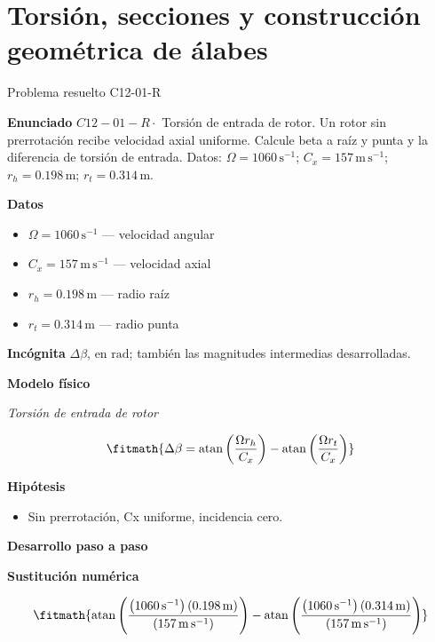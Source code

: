 \documentclass[10pt,openany]{book}
\begin{document}
\chapter{Torsión, secciones y construcción geométrica de álabes}
\begin{studiumworked}{Problema resuelto C12-01-R}


\noindent\textbf{Enunciado}
\(C12-01-R \cdot\) Torsión de entrada de rotor. Un rotor sin prerrotación recibe velocidad axial uniforme. Calcule beta a raíz y punta y la diferencia de torsión de entrada. Datos: \(\Omega=1060\, \mathrm{s}^{-1}\); \(C_x=157\, \mathrm{m}\,\mathrm{s}^{-1}\); \(r_h=0.198\, \mathrm{m}\); \(r_t=0.314\, \mathrm{m}\).

\noindent\textbf{Datos}
\begin{itemize}
\item $\Omega = 1060\,\mathrm{s}^{-1}$ — velocidad angular
\item $C_x = 157\,\mathrm{m}\,\mathrm{s}^{-1}$ — velocidad axial
\item $r_h = 0.198\,\mathrm{m}$ — radio raíz
\item $r_t = 0.314\,\mathrm{m}$ — radio punta
\end{itemize}

\noindent\textbf{Incógnita}
$\Delta\beta$, en $\mathrm{rad}$; también las magnitudes intermedias desarrolladas.

\noindent\textbf{Modelo físico}

\noindent\textit{Torsión de entrada de rotor}

\[
\fitmath{\Delta\beta=\operatorname{atan}{\left(\frac{\Omega r_h}{C_x} \right)} - \operatorname{atan}{\left(\frac{\Omega r_t}{C_x} \right)}}
\]

\noindent\textbf{Hipótesis}
\begin{itemize}
\item Sin prerrotación, Cx uniforme, incidencia cero.
\end{itemize}

\noindent\textbf{Desarrollo paso a paso}



\noindent\textbf{Sustitución numérica}

\[
\fitmath{\operatorname{atan}{\left(\frac{\left(1060\,\mathrm{s}^{-1}\right) \left(0.198\,\mathrm{m}\right)}{\left(157\,\mathrm{m}\,\mathrm{s}^{-1}\right)} \right)} - \operatorname{atan}{\left(\frac{\left(1060\,\mathrm{s}^{-1}\right) \left(0.314\,\mathrm{m}\right)}{\left(157\,\mathrm{m}\,\mathrm{s}^{-1}\right)} \right)}}
\]


\end{studiumworked}
\end{document}
